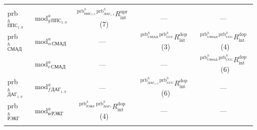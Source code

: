 \begin{table}
{\begin{sideways}
\begin{tabular}{|l|l|c|c|c|}
&&&&\\[-6pt]


prb$^h_{\mathrm{ППС}_{1\mbox{--}9}}$&$\mathrm{mod}^a_{g\,\mathrm{ППС}_{1\mbox{--}9}}$&


${}^{\mathrm{prb}^h_{\mathrm{ППС}_{1\mbox{--}9}}\,\mathrm{prb}^h_{\mathrm{ДАГ}_{1\mbox{--}9}}}


R_{\mathrm{int}}^{\mathrm{upr}}$~(7)&---&---\\[6pt]


prb$^h_{\mathrm{СМАД}}$&$\mathrm{mod}^a_{n\,\mathrm{СМАД}}$&---


&${}^{\mathrm{prb}^h_{\mathrm{СМАД}}\,


\mathrm{prb}^h_{\mathrm{ССС}}}R_{\mathrm{int}}^{\mathrm{dop}}$~(3)&


${}^{\mathrm{prb}^h_{\mathrm{СМАД}}\,\mathrm{prb}^h_{\mathrm{ССС}}}R_{\mathrm{int}}^{\mathrm{dop}}$~(4)\\[6pt]


&$\mathrm{mod}^a_{e\,\mathrm{СМАД}}$&---&---&


${}^{\mathrm{prb}^h_{\mathrm{СМАД}}\,\mathrm{prb}^h_{\mathrm{ССС}}}R_{\mathrm{int}}^{\mathrm{dop}}$~(6)\\[6pt]


prb$^h_{\mathrm{ДАГ}_{1\mbox{--}9}}$&$\mathrm{mod}^a_{f\,\mathrm{ДАГ}_{1\mbox{--}9}}$


&---&${}^{\mathrm{prb}^h_{\mathrm{ДАГ}_{1\mbox{--}9}}\,\mathrm{prb}^h_{\mathrm{ССС}}}


R_{\mathrm{int}}^{\mathrm{dop}}$~(6)&---\\[6pt]


prb$^h_{\mathrm{РЭКГ}}$&$\mathrm{mod}^a_{\mathrm{н\,РЭКГ}}$&


${}^{\mathrm{prb}^h_{\mathrm{РЭКГ}}\,


\mathrm{prb}^h_{\mathrm{ДАГ_1}}}R_{\mathrm{int}}^{\mathrm{dop}}$~(4)&


---&---\\[-8pt]


&&&&\\


 \hline


 \end{tabular}


\end{sideways}


}




 \end{table}





